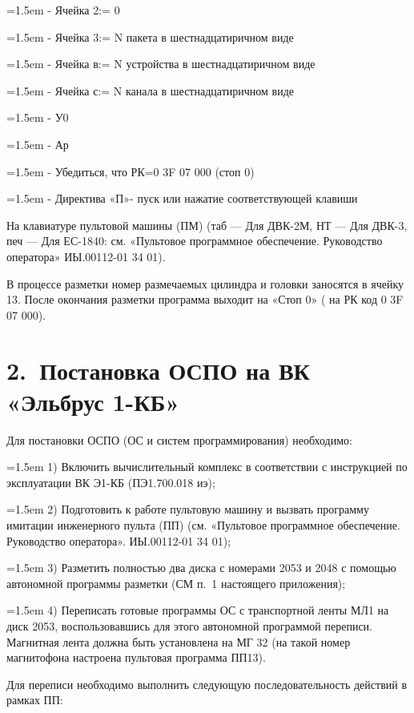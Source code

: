 \documentclass[11pt,a4paper]{article}
\begin{document}
\par\hangindent=1.5em - Ячейка 2:= 0\par
\par\hangindent=1.5em - Ячейка 3:= N пакета в шестнадцатиричном виде\par
\par\hangindent=1.5em - Ячейка в:= N устройства в шестнадцатиричном виде\par
\par\hangindent=1.5em - Ячейка с:= N канала в шестнадцатиричном виде\par
\par\hangindent=1.5em - У0\par
\par\hangindent=1.5em - Ар\par
\par\hangindent=1.5em - Убедиться, что РК=0 3F 07 000 (стоп 0)\par
\par\hangindent=1.5em - Директива «П»- пуск или нажатие соответствующей клавиши\par
На клавиатуре пультовой машины (ПМ) (таб --- Для ДВК-2М, НТ --- Для ДВК-3, печ --- Для ЕС-1840: см. «Пультовое программное обеспечение. Руководство оператора» ИЫ.00112-01 34 01).

В процессе разметки номер размечаемых цилиндра и головки заносятся в ячейку 13. После окончания разметки программа выходит на «Стоп 0» ( на РК код 0 3F 07 000).

\section*{2.~Постановка ОСПО на ВК «Эльбрус 1-КБ»}
Для постановки ОСПО (ОС и систем программирования) необходимо:

\par\hangindent=1.5em 1) Включить вычислительный комплекс в соответствии с инструкцией по эксплуатации ВК Э1-КБ (ПЭ1.700.018 иэ);\par
\par\hangindent=1.5em 2) Подготовить к работе пультовую машину и вызвать программу имитации инженерного пульта (ПП) (см. «Пультовое программное обеспечение. Руководство оператора». ИЫ.00112-01 34 01);\par
\par\hangindent=1.5em 3) Разметить полностью два диска с номерами 2053 и 2048 с помощью автономной программы разметки (СМ п.~1 настоящего приложения);\par
\par\hangindent=1.5em 4) Переписать готовые программы ОС с транспортной ленты МЛ1 на диск 2053, воспользовавшись для этого автономной программой переписи. Магнитная лента должна быть установлена на МГ 32 (на такой номер магнитофона настроена пультовая программа ПП13).\par
Для переписи необходимо выполнить следующую последовательность действий в рамках ПП:
\end{document}
